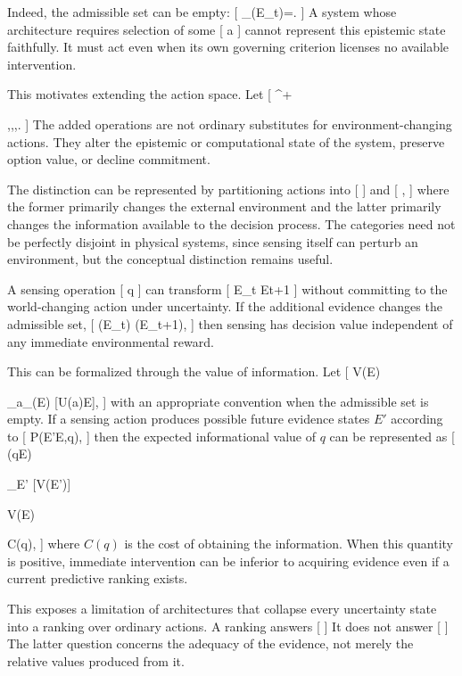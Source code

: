 \documentclass[11pt]{article}
\begin{document}
Indeed, the admissible set can be empty:
[
_{\Gamma}(E_t)=\varnothing.
]
A system whose architecture requires selection of some
[
a\in{}
]
cannot represent this epistemic state faithfully. It must act even when its own governing criterion licenses no available intervention.

This motivates extending the action space. Let
[
^{+}

\cup
{,,,}.
]
The added operations are not ordinary substitutes for environment-changing actions. They alter the epistemic or computational state of the system, preserve option value, or decline commitment.

The distinction can be represented by partitioning actions into
[
]
and
[
,
]
where the former primarily changes the external environment and the latter primarily changes the information available to the decision process. The categories need not be perfectly disjoint in physical systems, since sensing itself can perturb an environment, but the conceptual distinction remains useful.

A sensing operation
[
q\in{}
]
can transform
[
E_t
\longrightarrow
E{t+1}
]
without committing to the world-changing action under uncertainty. If the additional evidence changes the admissible set,
[
(E_t)
\neq
{}(E_{t+1}),
]
then sensing has decision value independent of any immediate environmental reward.

This can be formalized through the value of information. Let
[
V(E)

\max_{a\in{}_{\Gamma}(E)}
[U(a)\mid E],
]
with an appropriate convention when the admissible set is empty. If a sensing action produces possible future evidence states $E'$ according to
[
P(E'\mid E,q),
]
then the expected informational value of $q$ can be represented as
[
(q\mid E)

_{E'}
[V(E')]

V(E)

C(q),
]
where $C(q)$ is the cost of obtaining the information. When this quantity is positive, immediate intervention can be inferior to acquiring evidence even if a current predictive ranking exists.

This exposes a limitation of architectures that collapse every uncertainty state into a ranking over ordinary actions. A ranking answers
[
]
It does not answer
[
]
The latter question concerns the adequacy of the evidence, not merely the relative values produced from it.
\end{document}

